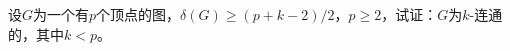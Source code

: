 \begin{Exercise}
    设$G$为一个有$p$个顶点的图，$\delta(G) \geq (p+k-2)/2$，$p\geq 2$，试证：$G$为$k$-连通的，其中$k<p$。
\end{Exercise}
